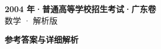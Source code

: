\documentclass[zihao=-4, a4paper]{ctexart}
\begin{document}
\begin{center}
  {\Large\bfseries 2004 年·普通高等学校招生考试·广东卷}\\[4pt]
  {\large 数学 · 解析版}
\end{center}
\medskip
{}

\clearpage
{}
\begin{center}{\Large\bfseries 参考答案与详细解析}\end{center}
\medskip

\end{document}
